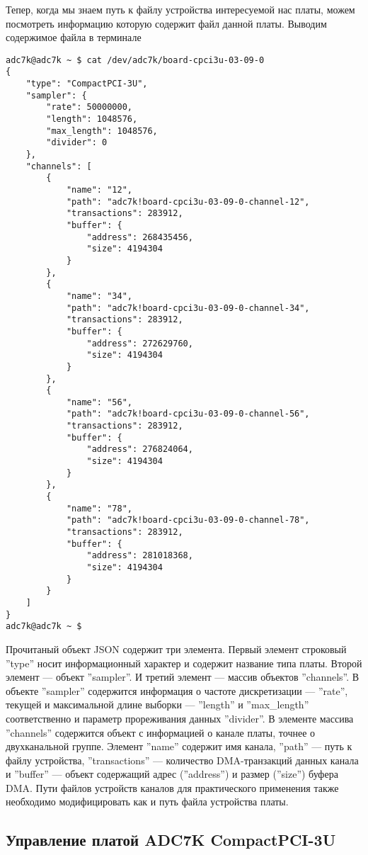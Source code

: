 \documentclass[a4paper]{article}
\begin{document}
Тепер, когда мы знаем путь к файлу устройства интересуемой нас платы, можем
посмотреть информацию которую содержит файл данной платы. Выводим
содержимое файла в терминале
\begin{small}\begin{verbatim}
adc7k@adc7k ~ $ cat /dev/adc7k/board-cpci3u-03-09-0
{
    "type": "CompactPCI-3U",
    "sampler": {
        "rate": 50000000,
        "length": 1048576,
        "max_length": 1048576,
        "divider": 0
    },
    "channels": [
        {
            "name": "12",
            "path": "adc7k!board-cpci3u-03-09-0-channel-12",
            "transactions": 283912,
            "buffer": {
                "address": 268435456,
                "size": 4194304
            }
        },
        {
            "name": "34",
            "path": "adc7k!board-cpci3u-03-09-0-channel-34",
            "transactions": 283912,
            "buffer": {
                "address": 272629760,
                "size": 4194304
            }
        },
        {
            "name": "56",
            "path": "adc7k!board-cpci3u-03-09-0-channel-56",
            "transactions": 283912,
            "buffer": {
                "address": 276824064,
                "size": 4194304
            }
        },
        {
            "name": "78",
            "path": "adc7k!board-cpci3u-03-09-0-channel-78",
            "transactions": 283912,
            "buffer": {
                "address": 281018368,
                "size": 4194304
            }
        }
    ]
}
adc7k@adc7k ~ $
\end{verbatim}\end{small}
Прочитаный объект JSON содержит три элемента. Первый элемент строковый ''type''
носит информационный характер и содержит название типа платы. Второй элемент ---
объект ''sampler''. И третий элемент --- массив объектов ''channels''. В объекте
''sampler'' содержится информация о частоте дискретизации --- ''rate'', текущей и
максимальной длине выборки --- ''length'' и ''max\_length'' соответственно и
параметр прореживания данных ''divider''. В элементе массива ''channels'' содержится
объект с информацией о канале платы, точнее о двухканальной группе. Элемент ''name''
содержит имя канала, ''path'' --- путь к файлу устройства, ''transactions'' ---
количество DMA-транзакций данных канала и ''buffer'' --- объект содержащий адрес
(''address'') и размер (''size'') буфера DMA. Пути файлов устройств каналов для
практического применения также необходимо модифицировать как и путь файла устройства
платы.

\subsection{Управление платой ADC7K CompactPCI-3U}
\end{document}
